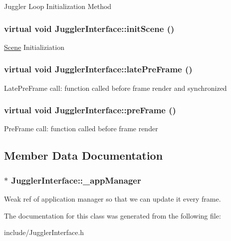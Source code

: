 \label{class_juggler_interface_a3859e165d20b4a94fc5455b38916510a}
Juggler Loop Initialization Method \hypertarget{class_juggler_interface_a15216b15082909f6dc9cfbaf3b2fa367}{
\subsubsection[{initScene}]{\setlength{\rightskip}{0pt plus 5cm}virtual void JugglerInterface::initScene ()}}
\label{class_juggler_interface_a15216b15082909f6dc9cfbaf3b2fa367}
\hyperlink{class_scene}{Scene} Initializiation \hypertarget{class_juggler_interface_a5bb901dc4d7c08971c705ed6ce4b6591}{
\subsubsection[{latePreFrame}]{\setlength{\rightskip}{0pt plus 5cm}virtual void JugglerInterface::latePreFrame ()}}
\label{class_juggler_interface_a5bb901dc4d7c08971c705ed6ce4b6591}
LatePreFrame call: function called before frame render and synchronized \hypertarget{class_juggler_interface_a0df0aec708dc6e958212df9b13fdb561}{
\subsubsection[{preFrame}]{\setlength{\rightskip}{0pt plus 5cm}virtual void JugglerInterface::preFrame ()}}
\label{class_juggler_interface_a0df0aec708dc6e958212df9b13fdb561}
PreFrame call: function called before frame render 

\subsection{Member Data Documentation}
\hypertarget{class_juggler_interface_a856ca6167dc926c37385d9bb58f44347}{
\subsubsection[{\_\-appManager}]{$\ast$ {\bf JugglerInterface::\_\-appManager}}}
\label{class_juggler_interface_a856ca6167dc926c37385d9bb58f44347}
Weak ref of application manager so that we can update it every frame. 

The documentation for this class was generated from the following file:\begin{DoxyCompactItemize}
\item 
include/JugglerInterface.h\end{DoxyCompactItemize}
